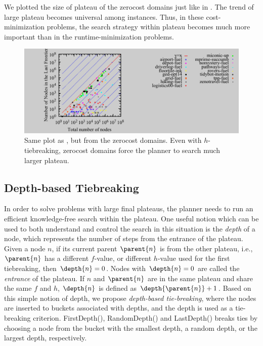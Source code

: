 We plotted the size of plateau of the zerocost domains just like in
. The trend of large plateau becomes universal among
instances. Thus, in these cost-minimization problems, the search strategy within
plateau becomes much more important than in the
runtime-minimization problems.

\begin{figure}[tb]
 \centering {}
  \includegraphics{tables/aaai16-frontier/zerocost/lmcut_frontier-front.pdf}
  \caption{Same plot as , but from the zerocost
  domains. Even with $h$-tiebreaking, zerocost domains force the planner
  to search much larger plateau.}
 \label{plateau-zerocost}
\end{figure}



\subsection{Depth-based Tiebreaking}

In order to solve problems with large final plateaus, the
planner needs to run an efficient knowledge-free search within the
plateau.  One useful notion which can be used to both understand and control the search in this
situation is the \emph{depth} of a node, which represents the number 
of steps from the entrance of the plateau.
Given a node $n$, if its current parent $\parent{n}$ is from the other
plateau, i.e., $\parent{n}$ has a
different $f$-value, or different $h$-value used for the first
tiebreaking, then $\depth{n} = 0$. Nodes with $\depth{n} = 0$ are called
the \emph{entrance} of the plateau.
If $n$ and $\parent{n}$ are in the same plateau and share the same $f$ and $h$,
$\depth{n}$ is defined as $\depth{\parent{n}} + 1$.
Based on this simple notion of depth,
we propose \emph{depth-based tie-breaking},
where the nodes are inserted to buckets associated with depths,
and the depth is used as a tie-breaking criterion.
FirstDepth(\fd), RandomDepth(\rd) and LastDepth(\ld) breaks ties by choosing a node from 
the bucket with the smallest depth, a random depth, or the largest depth, respectively.

